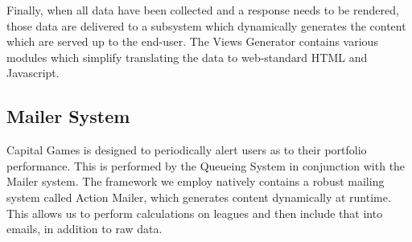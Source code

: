 Finally, when all data have been collected and a response needs to be rendered, those data
are delivered to a subsystem which dynamically generates the content
which are served up to the end-user. The Views Generator contains various modules which
simplify translating the data to web-standard HTML and Javascript.

\subsection{Mailer System}

Capital Games is designed to periodically alert users as to their portfolio performance.
This is performed by the Queueing System in conjunction with the Mailer system.
The framework we employ natively contains a robust mailing system called Action Mailer,
which generates content dynamically at runtime. \cite{action:mailer} This allows us to perform calculations
on leagues and then include that into emails, in addition to raw data.

